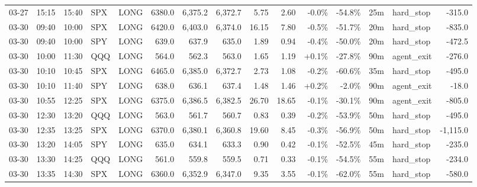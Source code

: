 \documentclass[11pt,a4paper,twoside]{article}
\begin{document}
\begin{landscape}
\begin{center}
\begin{longtable}{>{\color{txtmain}}l l l l l r r r r r r r r >{\color{txtmain}}l r}
03-27 & 15:15 & 15:40 & SPX & LONG & 6380.0 & 6,375.2 & 6,372.7 & 5.75 & 2.60 & \textcolor{lossred}{-0.0\%} & \textcolor{lossred}{-54.8\%} & 25m & hard\_stop & \textcolor{lossred}{-315.0} \\
03-30 & 09:40 & 10:00 & SPX & LONG & 6420.0 & 6,403.0 & 6,374.0 & 16.15 & 7.80 & \textcolor{lossred}{-0.5\%} & \textcolor{lossred}{-51.7\%} & 20m & hard\_stop & \textcolor{lossred}{-835.0} \\
03-30 & 09:40 & 10:00 & SPY & LONG & 639.0 & 637.9 & 635.0 & 1.89 & 0.94 & \textcolor{lossred}{-0.4\%} & \textcolor{lossred}{-50.0\%} & 20m & hard\_stop & \textcolor{lossred}{-472.5} \\
03-30 & 10:00 & 11:30 & QQQ & LONG & 564.0 & 562.3 & 563.0 & 1.65 & 1.19 & \textcolor{wingreen}{+0.1\%} & \textcolor{lossred}{-27.8\%} & 90m & agent\_exit & \textcolor{lossred}{-276.0} \\
03-30 & 10:10 & 10:45 & SPX & LONG & 6465.0 & 6,385.0 & 6,372.7 & 2.73 & 1.08 & \textcolor{lossred}{-0.2\%} & \textcolor{lossred}{-60.6\%} & 35m & hard\_stop & \textcolor{lossred}{-495.0} \\
03-30 & 10:10 & 11:40 & SPY & LONG & 638.0 & 636.1 & 637.4 & 1.48 & 1.46 & \textcolor{wingreen}{+0.2\%} & \textcolor{lossred}{-2.0\%} & 90m & agent\_exit & \textcolor{lossred}{-18.0} \\
03-30 & 10:55 & 12:25 & SPX & LONG & 6375.0 & 6,386.5 & 6,382.5 & 26.70 & 18.65 & \textcolor{lossred}{-0.1\%} & \textcolor{lossred}{-30.1\%} & 90m & agent\_exit & \textcolor{lossred}{-805.0} \\
03-30 & 12:30 & 13:20 & QQQ & LONG & 563.0 & 561.7 & 560.7 & 0.83 & 0.39 & \textcolor{lossred}{-0.2\%} & \textcolor{lossred}{-53.9\%} & 50m & hard\_stop & \textcolor{lossred}{-495.0} \\
03-30 & 12:35 & 13:25 & SPX & LONG & 6370.0 & 6,380.1 & 6,360.8 & 19.60 & 8.45 & \textcolor{lossred}{-0.3\%} & \textcolor{lossred}{-56.9\%} & 50m & hard\_stop & \textcolor{lossred}{-1,115.0} \\
03-30 & 13:20 & 14:05 & SPY & LONG & 635.0 & 634.1 & 633.3 & 0.90 & 0.42 & \textcolor{lossred}{-0.1\%} & \textcolor{lossred}{-52.5\%} & 45m & hard\_stop & \textcolor{lossred}{-235.0} \\
03-30 & 13:30 & 14:25 & QQQ & LONG & 561.0 & 559.8 & 559.5 & 0.71 & 0.33 & \textcolor{lossred}{-0.1\%} & \textcolor{lossred}{-54.5\%} & 55m & hard\_stop & \textcolor{lossred}{-234.0} \\
03-30 & 13:35 & 14:30 & SPX & LONG & 6360.0 & 6,352.9 & 6,347.0 & 9.35 & 3.55 & \textcolor{lossred}{-0.1\%} & \textcolor{lossred}{-62.0\%} & 55m & hard\_stop & \textcolor{lossred}{-580.0} \\

\end{longtable}
\end{center}
\end{landscape}
\end{document}
